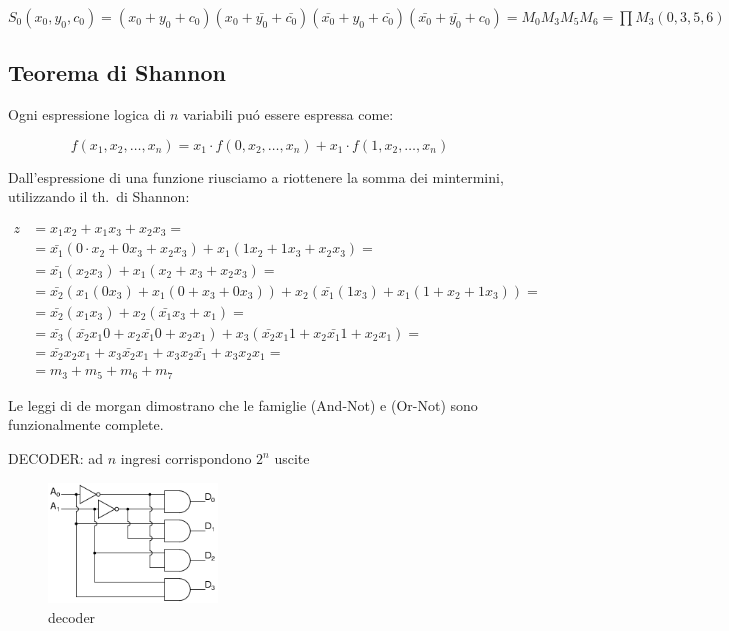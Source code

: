 \documentclass{article}
\begin{document}
$S_0 (x_0, y_0, c_0) = (x_0 + y_0 + c_0) (x_0 + \bar{y_0} + \bar{c_0}) (\bar{x_0} + y_0 + \bar{c_0}) (\bar{x_0} + \bar{y_0} + c_0) = M_0 M_3 M_5 M_6 = \prod M_3(0, 3, 5, 6)$


\subsection{Teorema di Shannon}
Ogni espressione logica di $n$ variabili pu\'o essere espressa come:

\[f(x_1, x_2, \ldots, x_n) = x_1 \cdot f(0, x_2, \ldots, x_n) + x_1 \cdot f(1, x_2, \ldots, x_n)\]

Dall'espressione di una funzione riusciamo a riottenere la somma dei mintermini, utilizzando il th.\ di Shannon:

\[
    \begin{split}
        z &= x_1 x_2 + x_1 x_3 + x_2 x_3 = \\
         &= \bar{x_1} ( 0 \cdot x_2 + 0 x_3 + x_2 x_3) + x_1 (1 x_2 + 1 x_3 + x_2 x_3) = \\
         &= \bar{x_1} (x_2 x_3) + x_1 (x_2 + x_3 + x_2 x_3) = \\
         &= \bar{x_2} (x_1 (0 x_3) + x_1 (0 + x_3 + 0 x_3)) + x_2 (\bar{x_1} (1 x_3) + x_1 (1 + x_2 + 1 x_3)) =\\
         &= \bar{x_2} (x_1 x_3) + x_2 (\bar{x_1} x_3 + x_1) =\\
         &= \bar{x_3} (\bar{x_2} x_1 0 + x_2 \bar{x_1} 0 + x_2 x_1) + x_3 (\bar{x_2} x_1 1 + x_2 \bar{x_1} 1 + x_2 x_1) =\\
         &= \bar{x_2} x_2 x_1 + x_3 \bar{x_2} x_1 + x_3 x_2 \bar{x_1} + x_3 x_2 x_1 =\\
         &= m_3 + m_5 + m_6 + m_7
  \end{split}
  \]


Le leggi di de morgan dimostrano che le famiglie (And-Not) e (Or-Not) sono funzionalmente complete.


DECODER: ad $n$ ingresi corrispondono $2^n$ uscite

\begin{figure}[h]
    \includegraphics[width=0.4\textwidth]{decoder}
    \centering
    \caption{decoder}
\end{figure}
\end{document}
